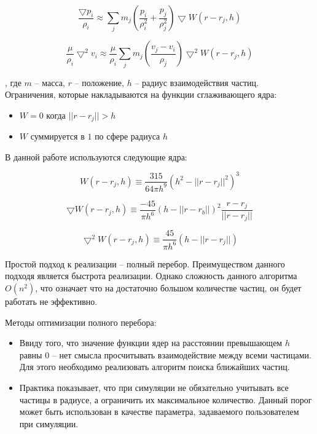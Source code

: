 \begin{equation}
\label{eq:}
\frac{\bigtriangledown{}p_i}{\rho_i} \approx \sum_{j}m_j(\frac{p_i}{\rho_i^2} + \frac{p_j}{\rho_j^2})\bigtriangledown{}W(r - r_j, h)
\end{equation}

\begin{equation}
\label{eq:}
\frac{\mu}{\rho_i}\bigtriangledown^2v_i \approx \frac{\mu}{\rho_i}\sum_{j}m_j(\frac{v_j - v_i}{\rho_j})\bigtriangledown^2W(r - r_j, h)
\end{equation}

, где $m$ -- масса, $r$ -- положение, $h$ -- радиус взаимодействия частиц. \\

Ограничения, которые накладываются на функции сглаживающего ядра:

\begin{itemize}
  \item $W = 0$ когда $||r - r_j|| > h$
  \item $W$ суммируется в $1$ по сфере радиуса $h$
\end{itemize}

В данной работе используются следующие ядра:

\begin{equation}
\label{eq:}
W(r - r_j, h) \equiv \frac{315}{64\pi{}h^9}(h^2-||r-r_j||^2)^3
\end{equation}

\begin{equation}
\label{eq:}
\bigtriangledown{}W(r - r_j, h) \equiv \frac{-45}{\pi{}h^6}(h - ||r - r_b||)^2\frac{r - r_j}{||r - r_j||}
\end{equation}

\begin{equation}
\label{eq:}
\bigtriangledown^2W(r - r_j, h) \equiv \frac{45}{\pi{}h^6}(h - ||r - r_j||)
\end{equation}

Простой подход к реализации -- полный перебор. Преимуществом данного подходя является быстрота
реализации. Однако сложность данного алгоритма $O(n^2)$, что означает что на достаточно большом
количестве частиц, он будет работать не эффективно.

Методы оптимизации полного перебора:

\begin{itemize}
  \item Ввиду того, что значение функции ядер на расстоянии превышающем $h$ равны 0 -- нет смысла
    просчитывать взаимодействие между всеми частицами. Для этого необходимо реализовать
    алгоритм поиска ближайших частиц.
  \item Практика показывает, что при симуляции не обязательно учитывать все частицы в радиусе, а
    ограничить их максимальное количество. Данный порог может быть использован в качестве
    параметра, задаваемого пользователем при симуляции.
\end{itemize}


